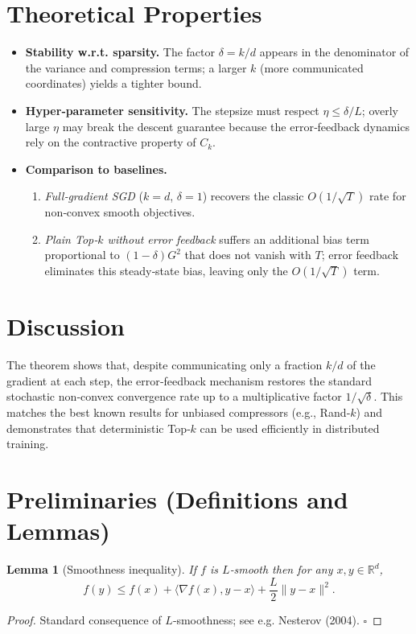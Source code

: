 \documentclass{article}
\newtheorem{lemma}{Lemma}
\begin{document}
\section*{Theoretical Properties}
\begin{itemize}
    \item \textbf{Stability w.r.t. sparsity.} The factor $\delta=k/d$ appears in the denominator of the variance and compression terms; a larger $k$ (more communicated coordinates) yields a tighter bound.
    \item \textbf{Hyper‑parameter sensitivity.} The stepsize must respect $\eta\le\delta/L$; overly large $\eta$ may break the descent guarantee because the error‑feedback dynamics rely on the contractive property of $C_k$.
    \item \textbf{Comparison to baselines.}
          \begin{enumerate}
              \item \emph{Full‑gradient SGD} ($k=d$, $\delta=1$) recovers the classic $O(1/\sqrt{T})$ rate for non‑convex smooth objectives.
              \item \emph{Plain Top‑$k$ without error feedback} suffers an additional bias term proportional to $(1-\delta)G^{2}$ that does not vanish with $T$; error feedback eliminates this steady‑state bias, leaving only the $O(1/\sqrt{T})$ term.
          \end{enumerate}
\end{itemize}

\section*{Discussion}
The theorem shows that, despite communicating only a fraction $k/d$ of the gradient at each step, the error‑feedback mechanism restores the standard stochastic non‑convex convergence rate up to a multiplicative factor $1/\sqrt{\delta}$. This matches the best known results for unbiased compressors (e.g., Rand‑$k$) and demonstrates that deterministic Top‑$k$ can be used efficiently in distributed training.

\newpage

\section*{Preliminaries (Definitions and Lemmas)}
\begin{lemma}[Smoothness inequality]\label{lem:smooth}
If $f$ is $L$‑smooth then for any $x,y\in\mathbb{R}^{d}$,
\[
f(y)\le f(x)+\langle\nabla f(x),y-x\rangle+\frac{L}{2}\|y-x\|^{2}.
\tag{L1}
\]
\end{lemma}
\begin{proof}
Standard consequence of $L$‑smoothness; see e.g. Nesterov (2004). \hfill $\square$
\end{proof}
\end{document}
